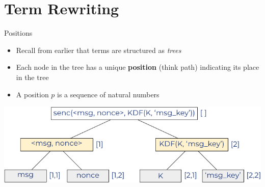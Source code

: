 \documentclass[11pt,aspectratio=169]{beamer}
\begin{document}

\section{Term Rewriting}


\begin{frame}[fragile]{Positions}
    \begin{itemize}
        \item Recall from earlier that terms are structured as \textit{trees}
        \item Each node in the tree has a unique \textbf{position} (think path) 
              indicating its place in the tree
        \item A position $p$ is a sequence of natural numbers\par
    \end{itemize}
    \vfill
    \begin{center}
        \includegraphics[width=.6\textwidth]{figures/lecture_1/terms_2}
    \end{center}
\end{frame}
\end{document}
